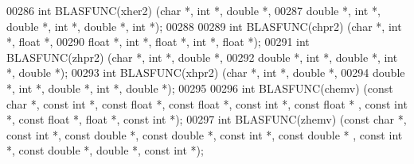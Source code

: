 \begin{DoxyCode}
00286 \textcolor{keywordtype}{int} BLASFUNC(xher2) (\textcolor{keywordtype}{char} *, \textcolor{keywordtype}{int} *, \textcolor{keywordtype}{double}  *,
00287              \textcolor{keywordtype}{double} *, \textcolor{keywordtype}{int} *, \textcolor{keywordtype}{double} *, \textcolor{keywordtype}{int} *, \textcolor{keywordtype}{double} *, \textcolor{keywordtype}{int} *);
00288 
00289 \textcolor{keywordtype}{int} BLASFUNC(chpr2) (\textcolor{keywordtype}{char} *, \textcolor{keywordtype}{int} *, \textcolor{keywordtype}{float}   *,
00290              \textcolor{keywordtype}{float}  *, \textcolor{keywordtype}{int} *, \textcolor{keywordtype}{float}  *, \textcolor{keywordtype}{int} *, \textcolor{keywordtype}{float}  *);
00291 \textcolor{keywordtype}{int} BLASFUNC(zhpr2) (\textcolor{keywordtype}{char} *, \textcolor{keywordtype}{int} *, \textcolor{keywordtype}{double}  *,
00292              \textcolor{keywordtype}{double} *, \textcolor{keywordtype}{int} *, \textcolor{keywordtype}{double} *, \textcolor{keywordtype}{int} *, \textcolor{keywordtype}{double} *);
00293 \textcolor{keywordtype}{int} BLASFUNC(xhpr2) (\textcolor{keywordtype}{char} *, \textcolor{keywordtype}{int} *, \textcolor{keywordtype}{double}  *,
00294              \textcolor{keywordtype}{double} *, \textcolor{keywordtype}{int} *, \textcolor{keywordtype}{double} *, \textcolor{keywordtype}{int} *, \textcolor{keywordtype}{double} *);
00295 
00296 \textcolor{keywordtype}{int} BLASFUNC(chemv) (\textcolor{keyword}{const} \textcolor{keywordtype}{char} *, \textcolor{keyword}{const} \textcolor{keywordtype}{int} *, \textcolor{keyword}{const} \textcolor{keywordtype}{float}  *, \textcolor{keyword}{const} \textcolor{keywordtype}{float}  *, \textcolor{keyword}{const} \textcolor{keywordtype}{int} *, \textcolor{keyword}{const} \textcolor{keywordtype}{float}  *
      , \textcolor{keyword}{const} \textcolor{keywordtype}{int} *, \textcolor{keyword}{const} \textcolor{keywordtype}{float}  *, \textcolor{keywordtype}{float}  *, \textcolor{keyword}{const} \textcolor{keywordtype}{int} *);
00297 \textcolor{keywordtype}{int} BLASFUNC(zhemv) (\textcolor{keyword}{const} \textcolor{keywordtype}{char} *, \textcolor{keyword}{const} \textcolor{keywordtype}{int} *, \textcolor{keyword}{const} \textcolor{keywordtype}{double} *, \textcolor{keyword}{const} \textcolor{keywordtype}{double} *, \textcolor{keyword}{const} \textcolor{keywordtype}{int} *, \textcolor{keyword}{const} \textcolor{keywordtype}{double} *
      , \textcolor{keyword}{const} \textcolor{keywordtype}{int} *, \textcolor{keyword}{const} \textcolor{keywordtype}{double} *, \textcolor{keywordtype}{double} *, \textcolor{keyword}{const} \textcolor{keywordtype}{int} *);

\end{DoxyCode}
